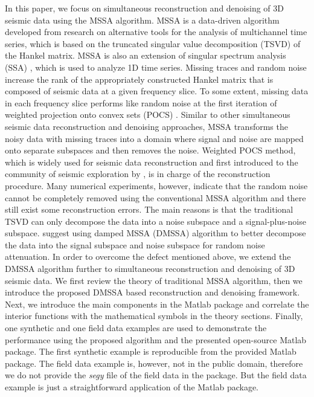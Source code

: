 In this paper, we focus on simultaneous reconstruction and denoising of 3D seismic data using the MSSA algorithm. MSSA is a data-driven algorithm developed from research on alternative tools for the analysis of multichannel time series, which is based on the truncated singular value decomposition (TSVD) \cite[]{golub} of the Hankel matrix. MSSA is also an extension of singular spectrum analysis (SSA) \cite[]{vautard}, which is used to analyze 1D time series. Missing traces and random noise increase the rank of the appropriately constructed Hankel matrix that is composed of seismic data at a given frequency slice. To some extent, missing data in each frequency slice performs like random noise at the first iteration of weighted projection onto convex sets (POCS) . Similar to other simultaneous seismic data reconstruction and denoising approaches, MSSA transforms the noisy data with missing traces into a domain where signal and noise are mapped onto separate subspaces and then removes the noise. Weighted POCS method, which is widely used for seismic data reconstruction and first introduced to the community of seismic exploration by \cite{abmapocs}, is in charge of the reconstruction procedure. Many numerical experiments, however, indicate that the random noise cannot be completely removed using the conventional MSSA algorithm and there still exist some reconstruction errors. The main reasons is that the traditional TSVD can only decompose the data into a noise subspace and a signal-plus-noise subspace. \cite{weilin2016} suggest using damped MSSA (DMSSA) algorithm to better decompose the data into the signal subspace and noise subspace for random noise attenuation. In order to overcome the defect mentioned above, we extend the DMSSA algorithm further to simultaneous reconstruction and denoising of 3D seismic data. We first review the theory of traditional MSSA algorithm, then we introduce the proposed DMSSA based reconstruction and denoising framework. Next, we introduce the main components in the Matlab package and correlate the interior functions with the mathematical symbols in the theory sections. Finally, one synthetic and one field data examples are used to demonstrate the performance using the proposed algorithm and the presented open-source Matlab package. The first synthetic example is reproducible from the provided Matlab package. The field data example is, however, not in the public domain, therefore we do not provide the \emph{segy} file of the field data in the package. But the field data example is just a straightforward application of the Matlab package. 

